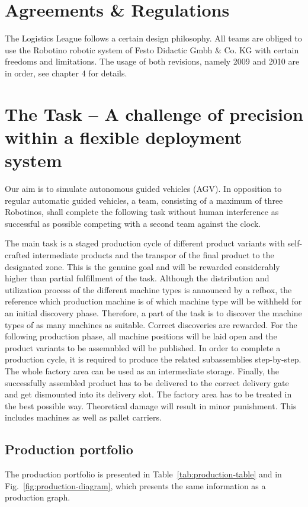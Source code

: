 \documentclass[12pt,twoside]{article}
\begin{document}
\section{Agreements \& Regulations}

The Logistics League follows a certain design philosophy. All teams
are obliged to use the Robotino robotic system of Festo Didactic Gmbh
\& Co. KG with certain freedoms and limitations. The usage of both
revisions, namely 2009 and 2010 are in order, see chapter 4 for
details.


\section{The Task -- A challenge of precision within a flexible
  deployment system}

Our aim is to simulate autonomous guided vehicles (AGV). In opposition
to regular automatic guided vehicles, a team, consisting of a maximum
of three Robotinos, shall complete the following task without human
interference as successful as possible competing with a second team
against the clock.

The main task is a staged production cycle of different product
variants with self-crafted intermediate products and the transpor  of
the final product to the designated zone. This is the genuine goal and
will be rewarded considerably higher than partial fulfillment of the
task. Although the distribution and utilization process of the
different machine types is announced by a refbox, the reference which
production machine is of which machine type will be withheld for an
initial discovery phase. Therefore, a part of the task is to discover
the machine types of as many machines as suitable. Correct discoveries
are rewarded. For the following production phase, all machine positions
will be laid open and the product variants to be assemnbled will be
published. In order to complete a production cycle, it is required to
produce the related subassemblies step-by-step. The whole factory area
can be used as an intermediate storage. Finally, the successfully
assembled product has to be delivered to the correct delivery gate and
get dismounted into its delivery slot. The factory area has to be
treated in the best possible way. Theoretical damage will result in
minor punishment. This includes machines as well as pallet carriers.

\subsection{Production portfolio}
The production portfolio is presented in
Table~\ref{tab:production-table} and in
Fig.~\ref{fig:production-diagram}, which presents the same information
as a production graph.
\end{document}
